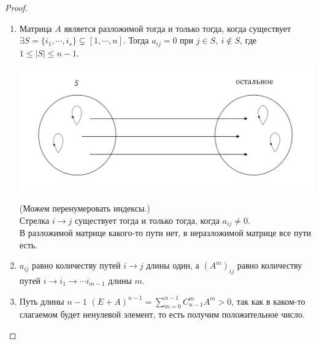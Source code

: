 \documentclass[12pt]{article}
\begin{document}
	\begin{proof}
		\ 
		\begin{enumerate}
		\item Матрица $A$ является разложимой тогда и только тогда, когда существует $\exists S=\{i_1,\cdots, i_s\} \subsetneq [1, \cdots, n]$. Тогда $a_{ij}=0$ при $j\in S,~i\notin S$, где $1\leqslant |S| \leqslant n-1$.\\
		\begin{center}
			\includegraphics[scale=0.6]{l14_3.png}\\
		\end{center}
		(Можем перенумеровать индексы.)\\
		Стрелка $i\to j$ существует тогда и только тогда, когда $a_{ij}\neq 0$.\\
		В разложимой матрице какого-то пути нет, в неразложимой матрице все пути есть.
		\item $a_{ij}$ равно количеству путей $i\to j$ длины один, а $(A^m)_{ij}$ равно количеству путей $i\to i_1\to \cdots i_{m-1}$ длины $m$.
		\item Путь длины $n-1$ $(E+A)^{n-1}=\sum\limits_{m=0}^{n-1}C_{n-1}^mA^m>0$, так как в каком-то слагаемом будет ненулевой элемент, то есть получим положительное число. 
	\end{enumerate}
	\end{proof}
\end{document}
